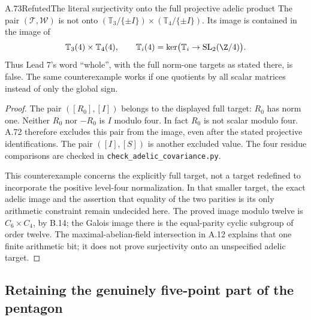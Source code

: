\begin{statement}{A.73}{Refuted}{The literal surjectivity onto the full projective adelic product}
The pair $(\mathcal T,\mathcal W)$ is not onto
$(\mathbb T_3/\{\pm I\})\times(\mathbb T_4/\{\pm I\})$.
Its image is contained in the image of
\[
 \mathbb T_3(4)\times\mathbb T_4(4),\qquad
 \mathbb T_i(4)=\ker\bigl(\mathbb T_i\to
                           \mathrm{SL}_2(\Z/4)\bigr).
\]
Thus Lead 7's word ``whole'', with the full norm-one targets
as stated there, is false. The same counterexample works
if one quotients by all scalar matrices instead of only the
global sign.
\end{statement}
\begin{proof}
The pair $([R_0],[I])$ belongs to the displayed full target:
$R_0$ has norm one. Neither $R_0$ nor $-R_0$ is $I$ modulo
four. In fact $R_0$ is not scalar modulo four. A.72 therefore
excludes this pair from the image, even after the stated
projective identifications. The pair $([I],[S])$ is another
excluded value. The four residue comparisons are checked
in \texttt{check\_adelic\_covariance.py}.

This counterexample concerns the explicitly full target, not
a target redefined to incorporate the positive level-four
normalization. In that smaller target, the exact adelic
image and the assertion that equality of the two parities
is its only arithmetic constraint remain undecided here.
The proved image modulo twelve is $C_6\times C_4$, by B.14;
the Galois image there is the equal-parity cyclic subgroup
of order twelve. The maximal-abelian-field intersection in
A.12 explains that one finite arithmetic bit; it does not
prove surjectivity onto an unspecified adelic target.
\end{proof}

\subsection{Retaining the genuinely five-point part of the pentagon}


